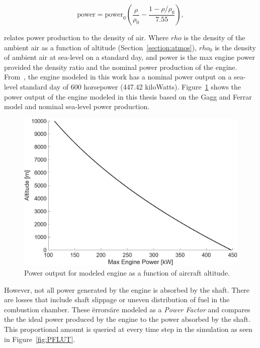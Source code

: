 \begin{equation}\label{eq:gaggandferrar}
    \textrm{power} = \textrm{power}_{0}\left(\frac{\rho}{\rho_0} - \frac{1 - \rho/\rho_0}{7.55}\right),
\end{equation}

relates power production to the density of air. Where \(rho\) is the density of the ambient air as a function of altitude (Section~\ref{section:atmos}), \(rho_0\) is the density of ambient air at sea-level on a standard day, and \(\textrm{power}\) is the max engine power provided the density ratio and the nominal power production of the engine. From~\cite{hartzellpropellerHartzellPropellerManual2023}, the engine modeled in this work has a nominal power output on a sea-level standard day of 600 horsepower (447.42 kiloWatts). Figure~\ref{fig:gaggferrar} shows the power output of the engine modeled in this thesis based on the Gagg and Ferrar model and nominal sea-level power production.

\begin{figure}[!ht]\label{fig:gaggferrar}
    \centering
    \includegraphics[width=0.85\linewidth]{Figures/gaggferrar.png}
    \caption{Power output for modeled engine as a function of aircraft altitude.}
\end{figure}

However, not all power generated by the engine is absorbed by the shaft. There are losses that include shaft slippage or uneven distribution of fuel in the combustion chamber. These \"errors\" are modeled as a \textit{Power Factor} and compares the the ideal power produced by the engine to the power absorbed by the shaft. This proportional amount is queried at every time step in the simulation as seen in Figure~\ref{fig:PFLUT}.

